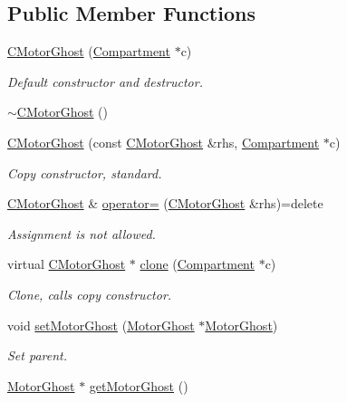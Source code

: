 \subsection*{Public Member Functions}
\begin{DoxyCompactItemize}
\item 
\hyperlink{classCMotorGhost_af158e8f7892b3b283d25a8750539a854}{C\+Motor\+Ghost} (\hyperlink{classCompartment}{Compartment} $\ast$c)
\begin{DoxyCompactList}\small\item\em Default constructor and destructor. \end{DoxyCompactList}\item 
\hyperlink{classCMotorGhost_abb169feb64336df9008c4f736c09a9b4}{$\sim$\+C\+Motor\+Ghost} ()
\item 
\hyperlink{classCMotorGhost_ad36a0bc57074dd813a0bf7ad75c6b0d7}{C\+Motor\+Ghost} (const \hyperlink{classCMotorGhost}{C\+Motor\+Ghost} \&rhs, \hyperlink{classCompartment}{Compartment} $\ast$c)
\begin{DoxyCompactList}\small\item\em Copy constructor, standard. \end{DoxyCompactList}\item 
\hyperlink{classCMotorGhost}{C\+Motor\+Ghost} \& \hyperlink{classCMotorGhost_afee33dd40280b1b63cd918db1de46df8}{operator=} (\hyperlink{classCMotorGhost}{C\+Motor\+Ghost} \&rhs)=delete
\begin{DoxyCompactList}\small\item\em Assignment is not allowed. \end{DoxyCompactList}\item 
virtual \hyperlink{classCMotorGhost}{C\+Motor\+Ghost} $\ast$ \hyperlink{classCMotorGhost_a73ff98b373999b7913d9629ac290240c}{clone} (\hyperlink{classCompartment}{Compartment} $\ast$c)
\begin{DoxyCompactList}\small\item\em Clone, calls copy constructor. \end{DoxyCompactList}\item 
void \hyperlink{classCMotorGhost_a1e18f9a0e0dcc0f2b4b140c3fb60bea8}{set\+Motor\+Ghost} (\hyperlink{classMotorGhost}{Motor\+Ghost} $\ast$\hyperlink{classMotorGhost}{Motor\+Ghost})
\begin{DoxyCompactList}\small\item\em Set parent. \end{DoxyCompactList}\item 
\hyperlink{classMotorGhost}{Motor\+Ghost} $\ast$ \hyperlink{classCMotorGhost_a7b5661e4a7bc38ce2657af40b9ff7d29}{get\+Motor\+Ghost} ()

\end{DoxyCompactItemize}
